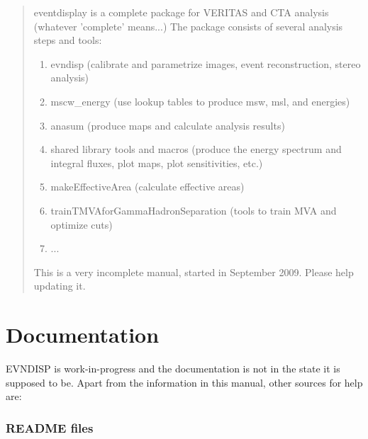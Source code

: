\documentclass[titlepage,a4paper,twoside,11pt]{report}
\newcommand{\clearemptydoublepage}{\newpage{\pagestyle{empty}\cleardoublepage}}
\begin{document}




\thispagestyle{empty}

\begin{abstract}

\noindent eventdisplay is a complete package for VERITAS and CTA analysis (whatever 'complete' means...)
The package consists of several analysis steps and tools:

\begin{enumerate}
\item evndisp (calibrate and parametrize images, event reconstruction, stereo analysis)
\item mscw\_energy (use lookup tables to produce msw, msl, and energies)
\item anasum (produce maps and calculate analysis results)
\item shared library tools and macros  (produce the energy spectrum and integral fluxes, plot maps, plot sensitivities, etc.) 
\item makeEffectiveArea (calculate effective areas)
\item trainTMVAforGammaHadronSeparation (tools to train MVA and optimize cuts)
\item ...
\end{enumerate}

This is a very incomplete manual, started in September 2009. Please help updating it.

\end{abstract}


\setcounter{page}{1}
\tableofcontents
\clearemptydoublepage



\chapter{Documentation}

EVNDISP is work-in-progress and the documentation is not in the state it is supposed to be. 
Apart from the information in this manual, other sources for help are:

\subsection*{README files}
\end{document}
